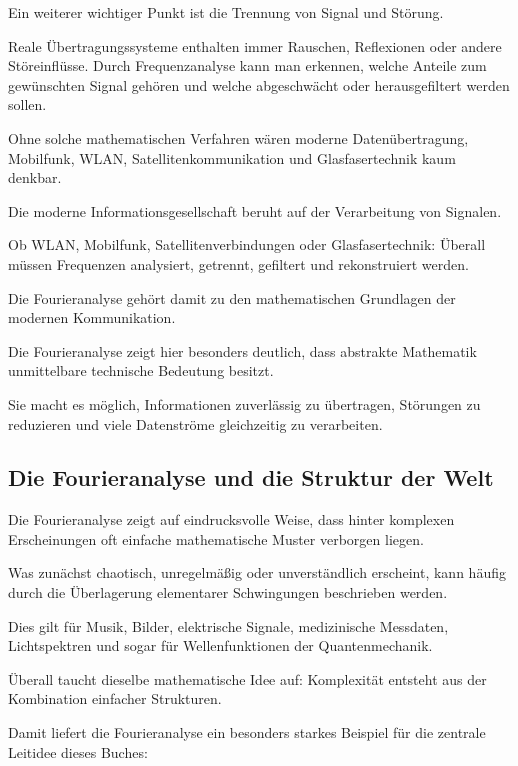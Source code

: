 Ein weiterer wichtiger Punkt ist die Trennung von Signal und Störung.

Reale Übertragungssysteme enthalten immer Rauschen,
Reflexionen
oder andere Störeinflüsse.
Durch Frequenzanalyse kann man erkennen,
welche Anteile zum gewünschten Signal gehören
und welche abgeschwächt oder herausgefiltert werden sollen.

Ohne solche mathematischen Verfahren wären moderne Datenübertragung,
Mobilfunk,
WLAN,
Satellitenkommunikation
und Glasfasertechnik kaum denkbar.

\begin{NoteBox}
	\small
	\label{box:fourier-digitale-welt}
	Die moderne Informationsgesellschaft beruht auf der Verarbeitung von Signalen.
	
	Ob WLAN,
	Mobilfunk,
	Satellitenverbindungen
	oder Glasfasertechnik:
	Überall müssen Frequenzen analysiert,
	getrennt,
	gefiltert
	und rekonstruiert werden.
	
	Die Fourieranalyse gehört damit zu den mathematischen Grundlagen
	der modernen Kommunikation.
\end{NoteBox}

Die Fourieranalyse zeigt hier besonders deutlich,
dass abstrakte Mathematik unmittelbare technische Bedeutung besitzt.

Sie macht es möglich,
Informationen zuverlässig zu übertragen,
Störungen zu reduzieren
und viele Datenströme gleichzeitig zu verarbeiten.

\subsection{Die Fourieranalyse und die Struktur der Welt}

Die Fourieranalyse zeigt auf eindrucksvolle Weise,
dass hinter komplexen Erscheinungen oft einfache mathematische Muster verborgen liegen.

Was zunächst chaotisch,
unregelmäßig
oder unverständlich erscheint,
kann häufig durch die Überlagerung elementarer Schwingungen beschrieben werden.

Dies gilt für Musik,
Bilder,
elektrische Signale,
medizinische Messdaten,
Lichtspektren
und sogar für Wellenfunktionen der Quantenmechanik.

Überall taucht dieselbe mathematische Idee auf:
Komplexität entsteht aus der Kombination einfacher Strukturen.

Damit liefert die Fourieranalyse ein besonders starkes Beispiel
für die zentrale Leitidee dieses Buches:

